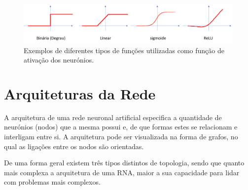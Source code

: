 \begin{figure}
    \hspace{-0.2in}
    \includegraphics[scale=0.53]{Imagens/actfun.png}
    \caption{Exemplos de diferentes tipos de funções utilizadas como função de ativação dos neurónios.}
    \label{fig:act-func}
\end{figure}

\section{Arquiteturas da Rede }
\label{sec:Arquiteturas}

A arquitetura de uma rede neuronal artificial especifica a quantidade de neurónios (nodos) que a mesma possui e, de que formas estes se relacionam e interligam entre si.
A arquitetura pode ser visualizada na forma de grafos, no qual as ligações entre os nodos são orientadas. 

De uma forma geral existem três tipos distintos de topologia, sendo que quanto mais complexa a arquitetura de uma RNA, maior a sua capacidade para lidar com problemas mais complexos. 

